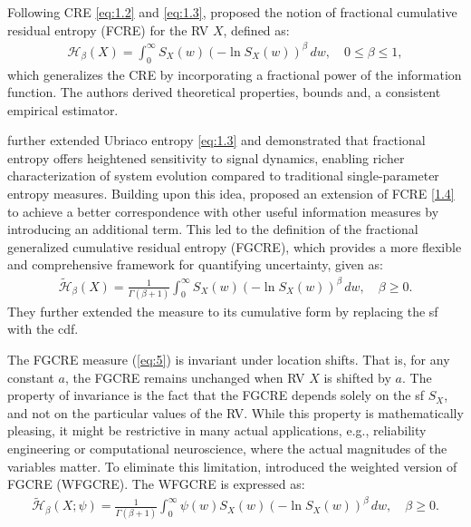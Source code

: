 \documentclass[12pt,a4paper]{article}
\numberwithin{equation}{section}
\begin{document}
Following CRE \eqref{eq:1.2} and \eqref{eq:1.3}, \cite{Xio2019} proposed the notion of  fractional cumulative residual entropy (FCRE) for the  RV $X$, defined as:
\begin{align}\label{1.4}
 {\mathcal H}_\beta(X) = \int_0^{\infty} S_X(w) \left(-\ln S_X(w)\right)^\beta \, dw, \quad 0 \leq \beta \leq 1,
\end{align}
which generalizes the CRE by incorporating a fractional power of the information function.  The authors derived theoretical properties, bounds and, a consistent empirical estimator. 

\cite{Mach2014} further extended Ubriaco entropy \eqref{eq:1.3} and demonstrated that fractional entropy offers heightened sensitivity to signal dynamics, enabling richer characterization of system evolution compared to traditional single-parameter entropy measures. Building upon this idea, \cite{Di2021}  proposed an extension of FCRE \eqref{1.4} to achieve a better correspondence with other useful information measures by introducing an additional term. This led to the definition of the fractional generalized cumulative residual entropy (FGCRE), which provides a more flexible and comprehensive framework for quantifying uncertainty, given as:
\begin{align}\label{eq:5}
	\tilde{\mathcal H}_\beta(X)=\frac{1}{\Gamma(\beta+1)}\int_0^\infty S_X(w)\left(-\ln S_X(w)\right)^\beta \, dw, \quad  \beta \geq 0.
\end{align} 
They further extended the measure to its cumulative form by replacing the sf with the cdf.

The FGCRE measure (\ref{eq:5}) is invariant under location shifts. That is, for any constant $a$,
the FGCRE remains unchanged when RV $X$ is shifted by $a$. The property of invariance is the fact that the FGCRE depends solely on the sf $S_X$, and not on the particular values of the RV. While this property is mathematically pleasing, it
might be restrictive in many actual applications, e.g., reliability engineering or computational
neuroscience, where the actual magnitudes of the variables matter. To eliminate this limitation,  \cite{alm2023} introduced the weighted version of FGCRE (WFGCRE). The WFGCRE is expressed as:
\begin{align}\label{eq::1.6}
	 \tilde{\mathcal H}_\beta(X;{\psi})= \frac{1}{\Gamma(\beta+1)} \int_0^{\infty}\psi(w) S_X(w) \left(-\ln S_X(w)\right)^\beta \, dw, \quad \beta \geq0.
\end{align}
    
\end{document}
